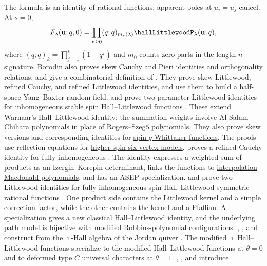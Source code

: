 The formula is an identity of rational functions; apparent poles
at $u_i=u_j$ cancel. At $s=0$,
\[
 F_\lambda(\mathbf{u};q,0)
 =\prod_{r\geq0}(q;q)_{m_r(\lambda)}
   \hallLittlewoodP_\lambda(\mathbf{u};q),
\]
where $(q;q)_k=\prod_{j=1}^k(1-q^j)$ and $m_0$ counts zero parts
in the length-$n$ signature. Borodin also proves skew Cauchy and
Pieri identities and orthogonality relations.
 and  give a combinatorial definition of
\label{stableSpinHallLittlewoodFunction}
\cite{ChenDing2021SpinHL}.  They prove skew Littlewood, refined Cauchy, and
refined Littlewood identities, and use them to build a half-space
Yang--Baxter random field.
 and  prove
two-parameter Littlewood identities for inhomogeneous stable spin
Hall--Littlewood functions \cite[Thm.~5.3]{GavrilovaKorotkikh2026x}.
These extend Warnaar's Hall--Littlewood identity: the summation weights
involve Al-Salam--Chihara polynomials in place of Rogers--Szegő polynomials.
They also prove skew versions and corresponding identities for
\hyperref[spinWhittakerLittlewood]{spin $q$-Whittaker functions}.
The proofs use reflection equations for
\hyperref[latticeModelVertex]{higher-spin six-vertex models}.
 proves a refined Cauchy identity for fully inhomogeneous
\label{spinHallLittlewoodRationalFunction}
\cite{Petrov2021SpinHLCauchy}.
The identity expresses a weighted sum of products as an Izergin--Korepin
determinant, links the functions to
\hyperref[macdonaldPi]{interpolation Macdonald polynomials}, and has an ASEP
specialization.
 and  prove two Littlewood identities
for fully inhomogeneous spin Hall--Littlewood symmetric rational functions
\cite{FischerGangl2026x}.  One product side contains the Littlewood kernel and
a simple correction factor, while the other contains the kernel and a
Pfaffian.  A specialization gives a new classical Hall--Littlewood identity,
and the underlying path model is bijective with modified Robbins-polynomial
configurations.
, , and  construct
\label{imathHallLittlewoodFunction}
from the $\imath$-Hall algebra of the
Jordan quiver \cite{LuRuanWang2025}.  The modified $\imath$
Hall--Littlewood functions specialize to the modified Hall--Littlewood
functions at $\theta=0$ and to deformed type $C$ universal characters at
$\theta=1$.
, , and  introduce
